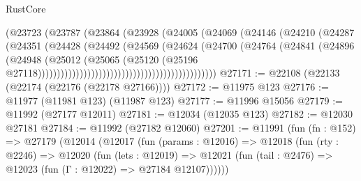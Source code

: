 \begin{lexlean}{RustCore}
\begin{coremodule}
                                                    (@23723
                                                      (@23787
                                                        (@23864
                                                          (@23928
                                                            (@24005
                                                              (@24069
                                                                (@24146
                                                                  (@24210
                                                                    (@24287
                                                                      (@24351
                                                                        (@24428
                                                                          (@24492
                                                                            (@24569
                                                                              (@24624
                                                                                (@24700
                                                                                  (@24764
                                                                                    (@24841
                                                                                      (@24896
                                                                                        (@24948
                                                                                          (@25012
                                                                                            (@25065
                                                                                              (@25120
                                                                                                (@25196
                                                                                                  @27118)))))))))))))))))))))))))))))))))))))))))))))))
@27171 := @22108 (@22133 (@22174 (@22176 (@22178 @27166))))
@27172 := @11975 @123
@27176 := @11977 (@11981 @123) (@11987 @123)
@27177 := @11996 @15056
@27179 := @11992 (@27177 @12011)
@27181 := @12034 (@12035 @123)
@27182 := @12030 @27181
@27184 := @11992 (@27182 @12060)
@27201 := @11991
    (fun (fn : @152) =>
    @27179
      (@12014
        (@12017
          (fun (params : @12016) =>
          @12018
            (fun (rty : @2246) =>
            @12020
              (fun (lets : @12019) =>
              @12021 (fun (tail : @2476) => @12023 (fun (Γ : @12022) => @27184 @12107))))))

\end{coremodule}
\end{lexlean}
